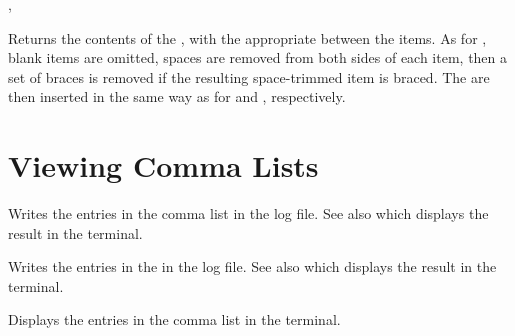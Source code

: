 \documentclass[oneside]{book}
\let\tn=\cs
\begin{document}
\begin{function}{\ClistJoin,\ClistJoinExtended}
\begin{syntax}
  
    
\end{syntax}
Returns the contents of the ,
with the appropriate  between the items. As for
, blank items are omitted, spaces are removed from
both sides of each item, then a set of braces is removed if the
resulting space-trimmed item is braced.  The  are
then inserted in the same way as for  and
, respectively.
\end{function}

\section{Viewing Comma Lists}

\begin{function}{\ClistLog}
\begin{syntax}
 
\end{syntax}
Writes the entries in the comma list in the log file. See also
 which displays the result in the terminal.
\end{function}

\begin{function}{\ClistVarLog}
\begin{syntax}
 
\end{syntax}
Writes the entries in the  in the log file. See
also  which displays the result in the terminal.
\end{function}

\begin{function}{\ClistShow}
\begin{syntax}
 
\end{syntax}
Displays the entries in the comma list in the terminal.
\end{function}
\end{document}
